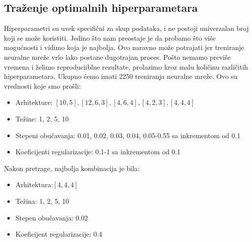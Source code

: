 \documentclass{article}
\newenvironment{solution}[2][]
    { \begin{mdframed}[backgroundcolor=gray!0] \textbf{#1 #2}}
    {  \end{mdframed}}
\begin{document}
    \begin{solution}{}
    \subsection*{Traženje optimalnih hiperparametara}
    Hiperparametri su uvek specifični za skup podataka, i ne postoji univerzalan broj koji se može koristiti. Jedino što nam preostaje je da probamo što više mogućnosti i vidimo koja je najbolja. Ovo naravno može potrajati jer treniranje neuralne mreže vrlo lako postane dugotrajan proces.
    Pošto nemamo previše vremena i želimo reproduciiblne rezultate, prolazimo kroz malu količinu različitih hiperparametara. Ukupno ćemo imati 2250 treniranja neuralne mreže.
    Ovo su vrednosti koje smo prošli:
    \begin{itemize}
        \item Arhitekture: $[10, 5], [12, 6, 3], [4,6,4], [4,2,3], [4,4,4]$
        \item Težine: 1, 2, 5, 10
        \item Stepeni obučavanja: 0.01, 0.02, 0.03, 0.04, 0.05-0.55 sa inkrementom od 0.1
        \item Koeficijenti regularizacije: 0.1-1 sa inkrementom od 0.1
    \end{itemize}
    Nakon pretrage, najbolja kombinacija je bila:
    \begin{itemize}
        \item Arhitektura:$[4,4,4]$
        \item Težina: 1, 2, 5, 10\item Stepen obučavanja: 0.02
        \item Koeficijent regularizacije: 0.4
    \end{itemize}
    \end{solution}\newpage
\end{document}
